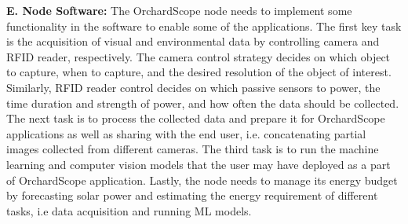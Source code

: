 \noindent
\textbf{E. Node Software:} 
The OrchardScope node needs to implement some functionality in the software to enable some of the applications. The first key task is the acquisition of visual and environmental data by controlling camera and RFID reader, respectively. The camera control strategy decides on which object to capture, when to capture, and the desired resolution of the object of interest. Similarly, RFID reader control decides on which passive sensors to power, the time duration and strength of power, and how often the data should be collected. The next task is to process the collected data and prepare it for OrchardScope applications as well as sharing with the end user, i.e. concatenating partial images collected from different cameras. The third task is to run the machine learning and computer vision models that the user may have deployed as a part of OrchardScope application. Lastly, the node needs to manage its energy budget by forecasting solar power and estimating the energy requirement of different tasks, i.e data acquisition and running ML models. 





